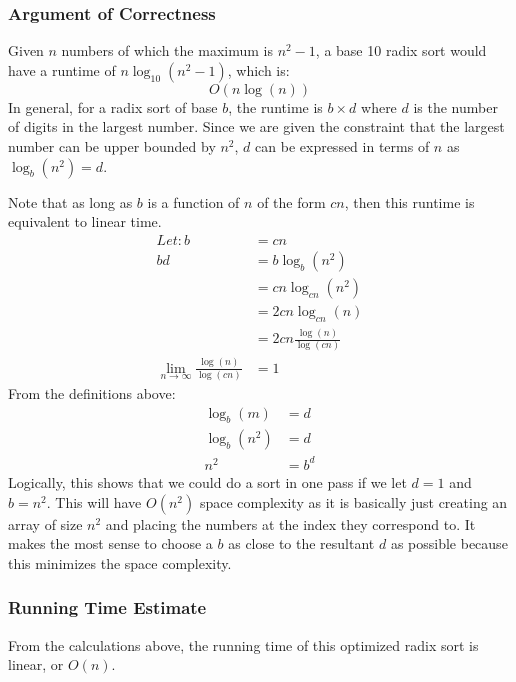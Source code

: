 \documentclass[letterpaper, 12pt]{math}
\begin{document}
\subsubsection*{Argument of Correctness}
Given \( n \) numbers of which the maximum is \( n^2-1 \), a base 10 radix sort
would have a runtime of \( n\log_{10}(n^2-1) \), which is:
\[ O(n\log(n)) \]
In general, for a radix sort of base \( b \), the runtime is \( b\times d \)
where \( d \) is the number of digits in the largest number. Since we are given
the constraint that the largest number can be upper bounded by \( n^2 \),
\( d \) can be expressed in terms of \( n \) as \( \log_b(n^2) = d \). \par
Note that as long as \( b \) is a function of \( n \) of the form \( cn \), then
this runtime is equivalent to linear time.
\begin{align*}
  Let: b &= cn \\
  bd &= b\log_b(n^2) \\
  &= cn\log_{cn}(n^2) \\
  &= 2cn\log_{cn}(n) \\
  &= 2cn\frac{\log(n)}{\log(cn)} \\
  \lim_{n\to\infty}\frac{\log(n)}{\log(cn)} &= 1
\end{align*}
From the definitions above:
\begin{align*}
  \log_b(m) &= d \\
  \log_b(n^2) &= d \\
  n^2 &= b^d
\end{align*}
Logically, this shows that we could do a sort in one pass if we let \( d = 1 \)
and \( b = n^2 \). This will have \( O(n^2) \) space complexity as it is
basically just creating an array of size \( n^2 \) and placing the numbers at
the index they correspond to. It makes the most sense to choose a \( b \) as
close to the resultant \( d \) as possible because this minimizes the space
complexity.

\subsubsection*{Running Time Estimate}
From the calculations above, the running time of this optimized radix sort is
linear, or \( O(n) \).
\end{document}
